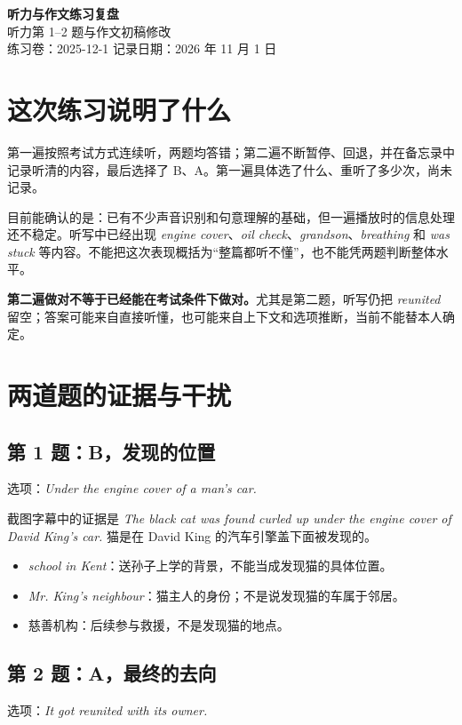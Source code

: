 \documentclass[UTF8,a4paper,11pt,fontset=fandol]{ctexart}
\newcommand{\en}[1]{\textit{#1}}
\begin{document}
\begin{center}
{\LARGE\bfseries 听力与作文练习复盘}\\[6pt]
{\large 听力第 1--2 题与作文初稿修改}\\[5pt]
练习卷：2025-12-1 \qquad 记录日期：2026 年 11 月 1 日
\end{center}

\section{这次练习说明了什么}
第一遍按照考试方式连续听，两题均答错；第二遍不断暂停、回退，并在备忘录中记录听清的内容，最后选择了 B、A。第一遍具体选了什么、重听了多少次，尚未记录。

目前能确认的是：已有不少声音识别和句意理解的基础，但一遍播放时的信息处理还不稳定。听写中已经出现 \en{engine cover}、\en{oil check}、\en{grandson}、\en{breathing} 和 \en{was stuck} 等内容。不能把这次表现概括为“整篇都听不懂”，也不能凭两题判断整体水平。

\textbf{第二遍做对不等于已经能在考试条件下做对。}尤其是第二题，听写仍把 \en{reunited} 留空；答案可能来自直接听懂，也可能来自上下文和选项推断，当前不能替本人确定。

\section{两道题的证据与干扰}
\subsection{第 1 题：B，发现的位置}
选项：\en{Under the engine cover of a man's car.}

截图字幕中的证据是 \en{The black cat was found curled up under the engine cover of David King's car.} 猫是在 David King 的汽车引擎盖下面被发现的。

\begin{itemize}
\item \en{school in Kent}：送孙子上学的背景，不能当成发现猫的具体位置。
\item \en{Mr. King's neighbour}：猫主人的身份；不是说发现猫的车属于邻居。
\item 慈善机构：后续参与救援，不是发现猫的地点。
\end{itemize}

\subsection{第 2 题：A，最终的去向}
选项：\en{It got reunited with its owner.}
\end{document}
